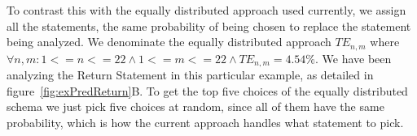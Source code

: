 \documentclass[conference]{IEEEtran}
\begin{document}

To contrast this with the equally distributed approach used currently, 
we assign all the statements, the same probability of being chosen to replace 
the statement being analyzed. We denominate the equally distributed approach 
$TE_{n,m}$ where $\forall n,m: 1<=n<=22 \land 1<=m<=22 \land TE_{n,m} = 4.54\%$. 
We have been analyzing the Return Statement in this particular example, as 
detailed in figure~\ref{fig:exPredReturn}B. To get the top five choices of the 
equally distributed schema we just pick five choices at random, since all of 
them have the same probability, which is how the current approach handles what 
statement to pick.


\end{document}
